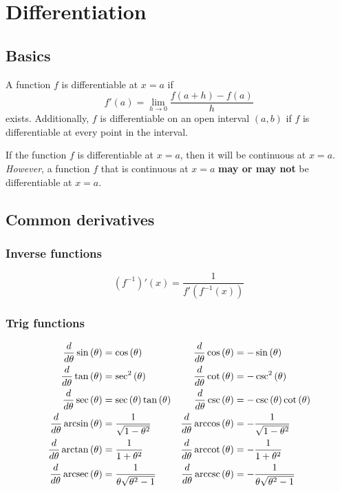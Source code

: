 \documentclass[main.tex]{subfiles}
\begin{document}
\section{Differentiation}
\begin{multicols}{2} \raggedcolumns \setcounter{unbalance}{10}
	\subsection*{Basics}
	\begin{definition}[informal]
	A function \(f\) is differentiable at \(x = a\) if \[f'(a) = \lim_{h \to 0} \frac{f(a+h) - f(a)}{h}\] exists.
	Additionally, \(f\) is differentiable on an open interval \((a, b)\) if \(f\) is differentiable at every point in the interval.
	\end{definition}
	\begin{note}
	If the function \(f\) is differentiable at \(x = a\), then it will be continuous at \(x = a\).
	\emph{However}, a function \(f\) that is continuous at \(x = a\) \textbf{may or may not} be differentiable at \(x = a\).
	\end{note}

	\subsection*{Common derivatives}
	\subsubsection*{Inverse functions}
	\begin{equation*}
		(f^{-1})' (x) = \frac{1}{f'(f^{-1}(x))}
	\end{equation*}
	\subsubsection*{Trig functions}
	\begin{align*}
		\frac{d}{d\theta} \sin{(\theta)} &= \cos{(\theta)} & \frac{d}{d\theta} \cos{(\theta)} &= -\sin{(\theta)} \\
		\frac{d}{d\theta} \tan{(\theta)} &= \sec^2{(\theta)} &  \frac{d}{d\theta} \cot{(\theta)} &= -\csc^2{(\theta)} \\
		\frac{d}{d\theta} \sec{(\theta)} &= \sec{(\theta)}\tan{(\theta)} & \frac{d}{d\theta} \csc{(\theta)} &= -\csc{(\theta)}\cot{(\theta)} \\
		\frac{d}{d\theta} \arcsin{(\theta)} &= \frac{1}{\sqrt{1 - \theta^2}} & \frac{d}{d\theta} \arccos{(\theta)} &= -\frac{1}{\sqrt{1 - \theta^2}} \\
		\frac{d}{d\theta} \arctan{(\theta)} &= \frac{1}{1 + \theta^2} & \frac{d}{d\theta} \operatorname{arccot}{(\theta)} &= -\frac{1}{1 + \theta^2} \\
		\frac{d}{d\theta} \operatorname{arcsec}{(\theta)} &= \frac{1}{\theta \sqrt{\theta^2 - 1}} & \frac{d}{d\theta} \operatorname{arccsc}{(\theta)} &= -\frac{1}{\theta \sqrt{\theta^2 - 1}}
	\end{align*}


\end{multicols}
\end{document}
